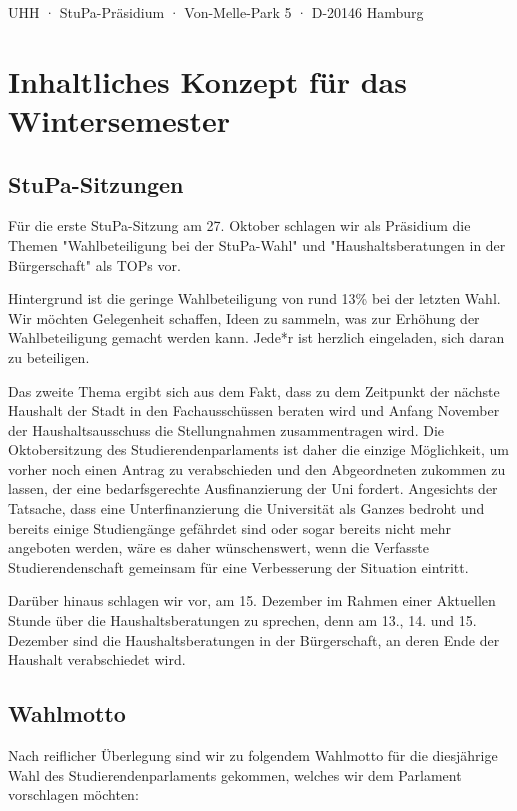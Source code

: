 \documentclass[ngerman,headheight=70pt]{scrartcl}
\begin{document}
    UHH · StuPa-Präsidium · Von-Melle-Park 5 · D-20146 Hamburg

    \section{Inhaltliches Konzept für das Wintersemester}

    \subsection{StuPa-Sitzungen}

    Für die erste StuPa-Sitzung am 27. Oktober schlagen wir als Präsidium die
    Themen "Wahlbeteiligung bei der StuPa-Wahl" und "Haushaltsberatungen in
    der Bürgerschaft" als TOPs vor.

    Hintergrund ist die geringe Wahlbeteiligung von rund 13\% bei der letzten
    Wahl. Wir möchten Gelegenheit schaffen, Ideen zu sammeln, was zur Erhöhung
    der Wahlbeteiligung gemacht werden kann. Jede*r ist herzlich eingeladen, sich
    daran zu beteiligen.

    Das zweite Thema ergibt sich aus dem Fakt, dass zu dem Zeitpunkt der nächste
    Haushalt der Stadt in den Fachausschüssen beraten wird und Anfang November
    der Haushaltsausschuss die Stellungnahmen zusammentragen wird. Die
    Oktobersitzung des Studierendenparlaments ist daher die einzige Möglichkeit,
    um vorher noch einen Antrag zu verabschieden und den Abgeordneten zukommen
    zu lassen, der eine bedarfsgerechte Ausfinanzierung der Uni fordert.
    Angesichts der Tatsache, dass eine Unterfinanzierung die Universität als
    Ganzes bedroht und bereits einige Studiengänge gefährdet sind oder sogar
    bereits nicht mehr angeboten werden, wäre es daher wünschenswert, wenn die
    Verfasste Studierendenschaft gemeinsam für eine Verbesserung der Situation
    eintritt.

    Darüber hinaus schlagen wir vor, am 15. Dezember im Rahmen einer Aktuellen
    Stunde über die Haushaltsberatungen zu sprechen, denn am 13., 14. und 15.
    Dezember sind die  Haushaltsberatungen in der Bürgerschaft, an deren Ende der
    Haushalt verabschiedet wird.


    \subsection{Wahlmotto}

    Nach reiflicher Überlegung sind wir zu folgendem Wahlmotto für die diesjährige
    Wahl des Studierendenparlaments gekommen, welches wir dem Parlament vorschlagen
    möchten:
\end{document}
